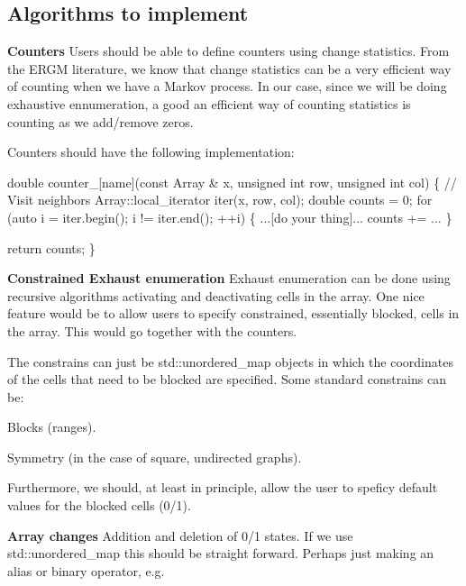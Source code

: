 \subsection*{Algorithms to implement}


\begin{DoxyItemize}
\item {\bfseries Counters} Users should be able to define counters using change statistics. From the E\+R\+GM literature, we know that change statistics can be a very efficient way of counting when we have a Markov process. In our case, since we will be doing exhaustive ennumeration, a good an efficient way of counting statistics is counting as we add/remove zeros.

Counters should have the following implementation\+:
\end{DoxyItemize}


\begin{DoxyCode}
\textcolor{keywordtype}{double} counter\_[name](\textcolor{keyword}{const} Array & x, \textcolor{keywordtype}{unsigned} \textcolor{keywordtype}{int} row, \textcolor{keywordtype}{unsigned} \textcolor{keywordtype}{int} col) \{
  \textcolor{comment}{// Visit neighbors}
  Array::local\_iterator iter(x, row, col);
  \textcolor{keywordtype}{double} counts = 0;
  \textcolor{keywordflow}{for} (\textcolor{keyword}{auto} i = iter.begin(); i != iter.end(); ++i) \{
    ...[\textcolor{keywordflow}{do} your thing]...
    counts += ...
  \}

  \textcolor{keywordflow}{return} counts;
\}
\end{DoxyCode}



\begin{DoxyItemize}
\item {\bfseries Constrained Exhaust enumeration} Exhaust enumeration can be done using recursive algorithms activating and deactivating cells in the array. One nice feature would be to allow users to specify constrained, essentially blocked, cells in the array. This would go together with the counters.

The constrains can just be {\ttfamily std\+::unordered\+\_\+map} objects in which the coordinates of the cells that need to be blocked are specified. Some standard constrains can be\+:
\begin{DoxyItemize}
\item Blocks (ranges).
\item Symmetry (in the case of square, undirected graphs).
\end{DoxyItemize}

Furthermore, we should, at least in principle, allow the user to speficy default values for the blocked cells (0/1).
\item {\bfseries Array changes} Addition and deletion of 0/1 states. If we use {\ttfamily std\+::unordered\+\_\+map} this should be straight forward. Perhaps just making an alias or binary operator, e.\+g.
\end{DoxyItemize}


